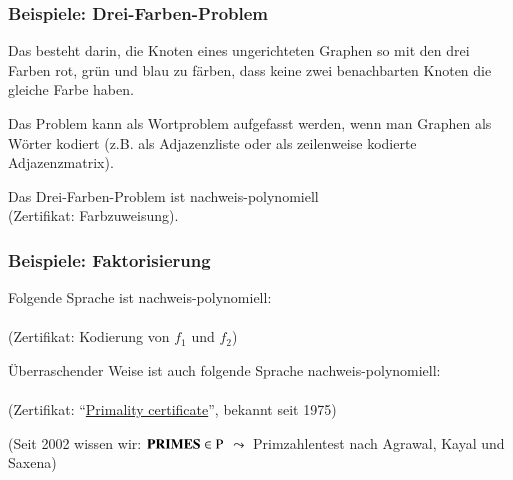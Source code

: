 \documentclass[onlymath]{beamer}
\begin{document}
\begin{frame}\frametitle{Beispiele: Drei-Farben-Problem}

Das  besteht darin, die Knoten eines ungerichteten Graphen so mit den
drei Farben rot, grün und blau zu färben, dass keine zwei benachbarten Knoten die gleiche Farbe haben.
\medskip

\pause

\medskip
Das Problem kann als Wortproblem aufgefasst werden, wenn man Graphen als Wörter kodiert (z.B. als Adjazenzliste oder als zeilenweise kodierte Adjazenzmatrix).
\medskip

\alert{Das Drei-Farben-Problem ist nachweis-polynomiell}\\ (Zertifikat: Farbzuweisung).

\end{frame}

\begin{frame}\frametitle{Beispiele: Faktorisierung}

\medskip

Folgende Sprache ist nachweis-polynomiell:\\[1ex]
\\[1ex]
(Zertifikat: Kodierung von $f_1$ und $f_2$)
\bigskip\pause

Überraschender Weise ist auch folgende Sprache nachweis-polynomiell:\\[1ex]
\\[1ex]
(Zertifikat: "`\href{https://en.wikipedia.org/wiki/Primality_certificate}{Primality certificate}"', bekannt seit 1975)
\bigskip\pause

\textcolor{devilscss}{(Seit 2002 wissen wir: $\textbf{PRIMES}\in{\textsc{P}}$ $\leadsto$ Primzahlentest nach Agrawal, Kayal und Saxena)}

\end{frame}
\end{document}
